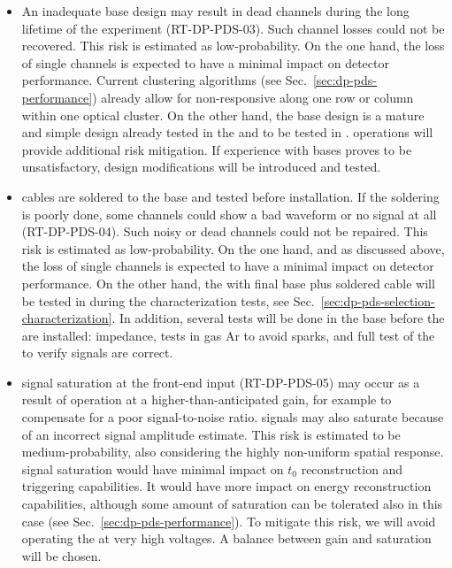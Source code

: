 \begin{itemize}
\item An inadequate  base design may result in dead  channels during the long lifetime of the experiment (RT-DP-PDS-03). Such channel losses could not be recovered. This risk is estimated as low-probability. On the one hand, the loss of single  channels is expected to have a minimal impact on detector performance. Current  clustering algorithms (see Sec.~\ref{sec:dp-pds-performance}) already allow for non-responsive  along one row or column within one optical cluster. On the other hand, the  base design is a mature and simple design already tested in the  and to be tested in .  operations will provide additional risk mitigation. If  experience with  bases proves to be unsatisfactory, design modifications will be introduced and tested.

\item {} cables are soldered to the  base and tested before installation. If the soldering is poorly done, some channels could show a bad waveform or no signal at all (RT-DP-PDS-04). Such noisy or dead channels could not be repaired. This risk is estimated as low-probability. On the one hand, and as discussed above, the loss of single  channels is expected to have a minimal impact on detector performance. On the other hand, the  with final base plus soldered cable will be tested in \lntwo during the  characterization tests, see Sec.~\ref{sec:dp-pds-selection-characterization}. In addition, several tests will be done in the base before the  are installed: impedance,  tests in gas Ar to avoid sparks, and full test of the  to verify signals are correct.

\item {} signal saturation at the front-end input (RT-DP-PDS-05) may occur as a result of operation at a higher-than-anticipated  gain, for example to compensate for a poor signal-to-noise ratio.  signals may also saturate because of an incorrect signal amplitude estimate. This risk is estimated to be medium-probability, also considering the highly non-uniform  spatial response.  signal saturation would have minimal impact on  $t_0$ reconstruction and triggering capabilities. It would have more impact on  energy reconstruction capabilities, although some amount of saturation can be tolerated also in this case (see Sec.~\ref{sec:dp-pds-performance}). To mitigate this risk, we will avoid operating the  at very high voltages. A balance between gain and saturation will be chosen.


\end{itemize}

